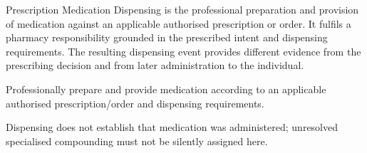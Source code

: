 Prescription Medication Dispensing is the professional preparation and provision of medication against an applicable authorised prescription or order. It fulfils a pharmacy responsibility grounded in the prescribed intent and dispensing requirements. The resulting dispensing event provides different evidence from the prescribing decision and from later administration to the individual.



Professionally prepare and provide medication according to an applicable authorised prescription/\allowbreak{}order and dispensing requirements.



Dispensing does not establish that medication was administered; unresolved specialised compounding must not be silently assigned here.


